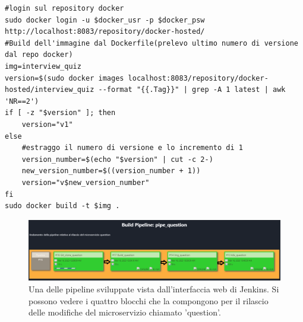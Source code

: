 \documentclass[a4paper,12pt]{report}
\begin{document}
\begin{lstlisting}[caption={\\\textit{Frammento di codice relativo al versionamento e alla build dell'immagine.}}]
#login sul repository docker
sudo docker login -u $docker_usr -p $docker_psw http://localhost:8083/repository/docker-hosted/
#Build dell'immagine dal Dockerfile(prelevo ultimo numero di versione dal repo docker)
img=interview_quiz
version=$(sudo docker images localhost:8083/repository/docker-hosted/interview_quiz --format "{{.Tag}}" | grep -A 1 latest | awk 'NR==2')
if [ -z "$version" ]; then
	version="v1"
else
    #estraggo il numero di versione e lo incremento di 1
    version_number=$(echo "$version" | cut -c 2-)
    new_version_number=$((version_number + 1))
    version="v$new_version_number"
fi
sudo docker build -t $img .
\end{lstlisting} 

\begin{figure}[h]
	\includegraphics[width=1.0\textwidth]{pipeline}
    \caption{Una delle pipeline sviluppate vista dall'interfaccia web di Jenkins. Si possono vedere i quattro blocchi che la compongono per il rilascio delle modifiche del microservizio chiamato 'question'.}
    \label{fig:pipeline}
\end{figure}
\end{document}
